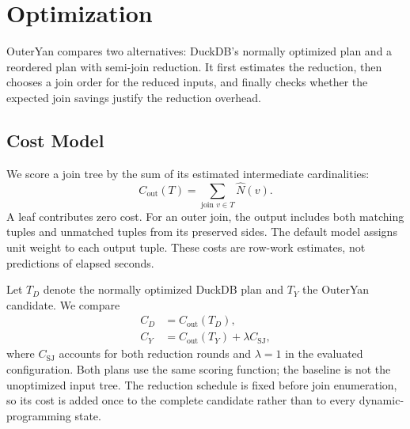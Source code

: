 \providecommand{\DuckOuterYanFigureDir}{auto_test/results/plots/20260916_211812/t32}

\section{Optimization}
\label{sec:optimization}

OuterYan compares two alternatives: DuckDB's normally optimized plan and a
reordered plan with semi-join reduction. It first estimates the reduction,
then chooses a join order for the reduced inputs, and finally checks whether
the expected join savings justify the reduction overhead.

\subsection{Cost Model}
\label{sec:cost-model}

We score a join tree by the sum of its estimated intermediate cardinalities:
\begin{equation}
 C_{\mathrm{out}}(T)=\sum_{\text{join }v\in T}\widehat{N}(v).
 \label{eq:cout}
\end{equation}
A leaf contributes zero cost. For an outer join, the output includes both
matching tuples and unmatched tuples from its preserved sides. The default
model assigns unit weight to each output tuple. These costs are row-work
estimates, not predictions of elapsed seconds.

Let $T_D$ denote the normally optimized DuckDB plan and $T_Y$ the OuterYan
candidate. We compare
\begin{equation}
 \begin{aligned}
 C_D &= C_{\mathrm{out}}(T_D),\\
 C_Y &= C_{\mathrm{out}}(T_Y)+\lambda C_{\mathrm{SJ}},
 \end{aligned}
 \label{eq:plan-costs}
\end{equation}
where $C_{\mathrm{SJ}}$ accounts for both reduction rounds and $\lambda=1$
in the evaluated configuration. Both plans use the same scoring function;
the baseline is not the unoptimized input tree. The reduction schedule is
fixed before join enumeration, so its cost is added once to the complete
candidate rather than to every dynamic-programming state.

